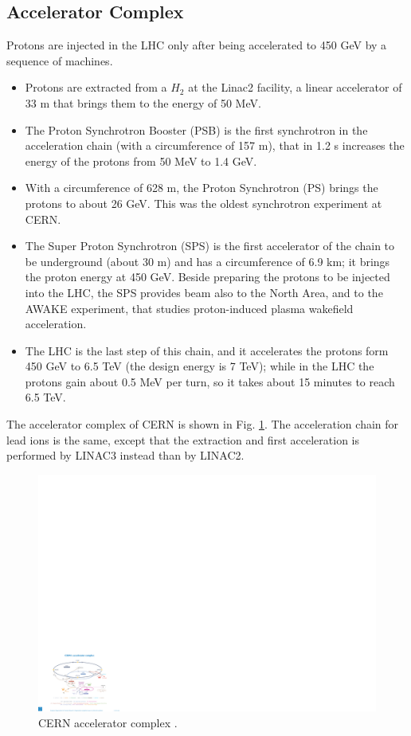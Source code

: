 \subsection{Accelerator Complex}

Protons are injected in the LHC only after being accelerated to 450 GeV by a sequence of machines.

\begin{itemize}
\item Protons are extracted from a $H_2$ at the Linac2 facility, a linear accelerator of 33 m that brings them to the energy of 50 MeV.
\item The Proton Synchrotron Booster (PSB) is the first synchrotron in the acceleration chain (with a circumference of 157 m), that in 1.2 s increases the energy of the protons from 50 MeV to 1.4 GeV.
\item With a circumference of 628 m, the Proton Synchrotron (PS) brings the protons to about 26 GeV. This was the oldest synchrotron experiment at CERN.
\item The Super Proton Synchrotron (SPS) is the first accelerator of the chain to be underground (about 30 m) and has a circumference of 6.9 km; it brings the proton energy at 450 GeV. Beside preparing the protons to be injected into the LHC, the SPS provides beam also to the North Area, and to the AWAKE experiment, that studies proton-induced plasma wakefield acceleration.
\item The LHC is the last step of this chain, and it accelerates the protons form 450 GeV to 6.5 TeV (the design energy is 7 TeV); while in the LHC the protons gain about 0.5 MeV per turn, so it takes about 15 minutes to reach 6.5 TeV.
\end{itemize}

The accelerator complex of CERN is shown in Fig. \ref{fig:lhc:acc}. The acceleration chain for lead ions is the same, except that the extraction and first acceleration is performed by LINAC3 instead than by LINAC2.

\begin{figure}[ht]
\centering
\includegraphics[width=1\textwidth]{figures/lhc/acc_complex.pdf}
\caption{CERN accelerator complex \cite{Christiane:1260465}.}
\label{fig:lhc:acc}
\end{figure}

